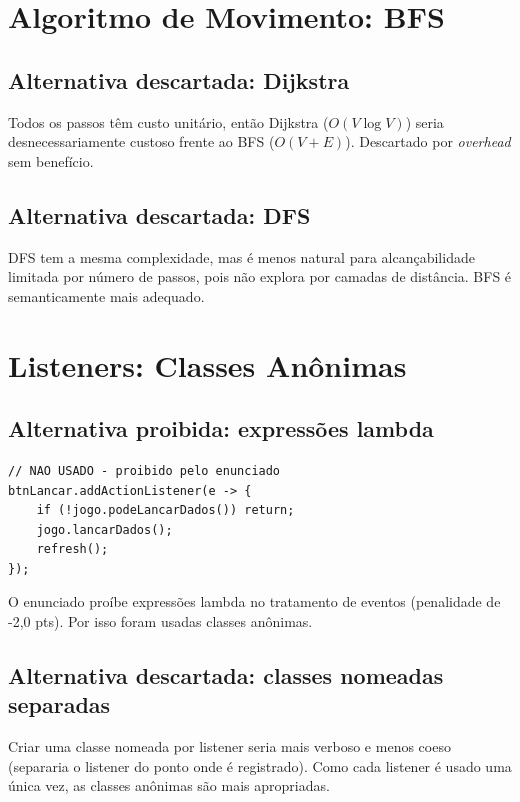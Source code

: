 \documentclass[12pt,a4paper]{report}
\begin{document}
\section{Algoritmo de Movimento: BFS}

\subsection{Alternativa descartada: Dijkstra}

Todos os passos têm custo unitário, então Dijkstra ($O(V \log V)$) seria desnecessariamente custoso frente ao BFS ($O(V + E)$). Descartado por \textit{overhead} sem benefício.

\subsection{Alternativa descartada: DFS}

DFS tem a mesma complexidade, mas é menos natural para alcançabilidade limitada por número de passos, pois não explora por camadas de distância. BFS é semanticamente mais adequado.

\section{Listeners: Classes Anônimas}

\subsection{Alternativa proibida: expressões lambda}

\begin{lstlisting}
// NAO USADO - proibido pelo enunciado
btnLancar.addActionListener(e -> {
    if (!jogo.podeLancarDados()) return;
    jogo.lancarDados();
    refresh();
});
\end{lstlisting}

O enunciado proíbe expressões lambda no tratamento de eventos (penalidade de -2,0 pts). Por isso foram usadas classes anônimas.

\subsection{Alternativa descartada: classes nomeadas separadas}

Criar uma classe nomeada por listener seria mais verboso e menos coeso (separaria o listener do ponto onde é registrado). Como cada listener é usado uma única vez, as classes anônimas são mais apropriadas.
\end{document}

